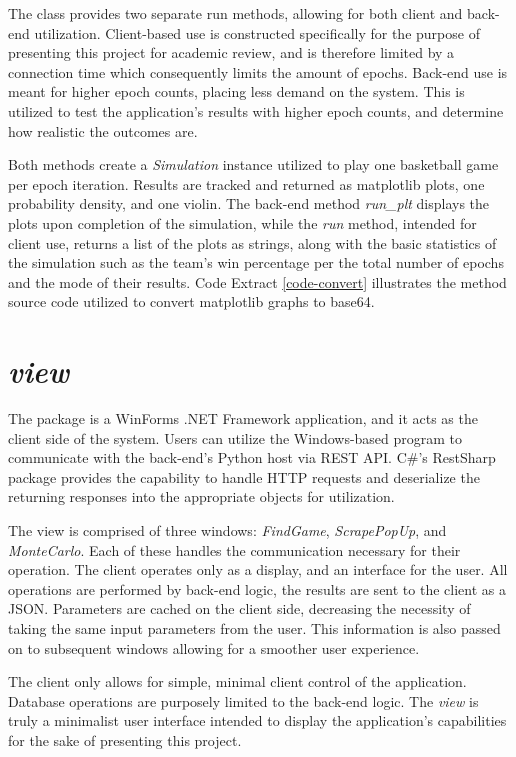 \documentclass{thesis-ekf}
\theoremstyle{definition}
\theoremstyle{remark}
\begin{document}
The class provides two separate run methods, allowing for both client and back-end utilization. Client-based use is constructed specifically for the purpose of presenting this project for academic review, and is therefore limited by a connection time which consequently limits the amount of epochs. Back-end use is meant for higher epoch counts, placing less demand on the system. This is utilized to test the application's results with higher epoch counts, and determine how realistic the outcomes are.

Both methods create a \emph{Simulation} instance utilized to play one basketball game per epoch iteration. Results are tracked and returned as matplotlib plots, one probability density, and one violin. The back-end method \emph{run\_plt} displays the plots upon completion of the simulation, while the \emph{run} method, intended for client use, returns a list of the plots as strings, along with the basic statistics of the simulation such as the team's win percentage per the total number of epochs and the mode of their results. Code Extract \ref{code-convert} illustrates the method source code utilized to convert matplotlib graphs to base64.



\section{\emph{view}}
The package is a WinForms .NET Framework application, and it acts as the client side of the system. Users can utilize the Windows-based program to communicate with the back-end's Python host via REST API. C\#'s RestSharp package provides the capability to handle HTTP requests and deserialize the returning responses into the appropriate objects for utilization.

The view is comprised of three windows: \emph{FindGame}, \emph{ScrapePopUp}, and \emph{MonteCarlo}. Each of these handles the communication necessary for their operation. The client operates only as a display, and an interface for the user. All operations are performed by back-end logic, the results are sent to the client as a JSON. Parameters are cached on the client side, decreasing the necessity of taking the same input parameters from the user. This information is also passed on to subsequent windows allowing for a smoother user experience.

The client only allows for simple, minimal client control of the application. Database operations are purposely limited to the back-end logic. The \emph{view} is truly a minimalist user interface intended to display the application's capabilities for the sake of presenting this project.
\end{document}
